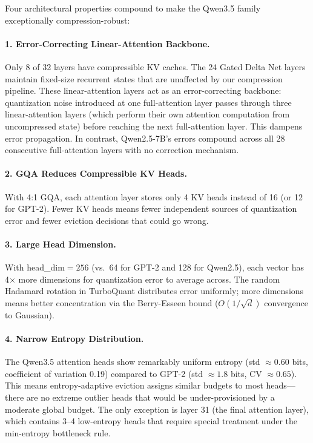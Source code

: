 \documentclass[11pt]{article}
\begin{document}
Four architectural properties compound to make the Qwen3.5 family exceptionally compression-robust:

\paragraph{1. Error-Correcting Linear-Attention Backbone.}
Only 8 of 32 layers have compressible KV caches.  The 24 Gated Delta Net layers maintain fixed-size recurrent states that are unaffected by our compression pipeline.  These linear-attention layers act as an error-correcting backbone: quantization noise introduced at one full-attention layer passes through three linear-attention layers (which perform their own attention computation from uncompressed state) before reaching the next full-attention layer.  This dampens error propagation.  In contrast, Qwen2.5-7B's errors compound across all 28 consecutive full-attention layers with no correction mechanism.

\paragraph{2. GQA Reduces Compressible KV Heads.}
With 4:1 GQA, each attention layer stores only 4 KV heads instead of 16 (or 12 for GPT-2).  Fewer KV heads means fewer independent sources of quantization error and fewer eviction decisions that could go wrong.

\paragraph{3. Large Head Dimension.}
With head\_dim${}=256$ (vs.\ 64 for GPT-2 and 128 for Qwen2.5), each vector has 4$\times$ more dimensions for quantization error to average across.  The random Hadamard rotation in TurboQuant distributes error uniformly; more dimensions means better concentration via the Berry-Esseen bound ($O(1/\sqrt{d})$ convergence to Gaussian).

\paragraph{4. Narrow Entropy Distribution.}
The Qwen3.5 attention heads show remarkably uniform entropy (std $\approx 0.60$ bits, coefficient of variation 0.19) compared to GPT-2 (std $\approx 1.8$ bits, CV $\approx 0.65$).  This means entropy-adaptive eviction assigns similar budgets to most heads---there are no extreme outlier heads that would be under-provisioned by a moderate global budget.  The only exception is layer 31 (the final attention layer), which contains 3--4 low-entropy heads that require special treatment under the min-entropy bottleneck rule.
\end{document}
